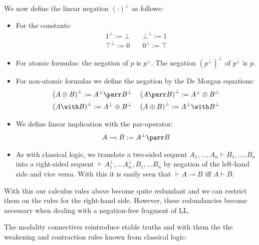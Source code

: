 \documentclass[DIN, pagenumber=false, fontsize=11pt, parskip=half, colorinlistoftodos, svgnames]{scrartcl}
\begin{document}
	
	We now define the linear negation $(\cdot)^\bot$ as follows:
	
	\begin{itemize}
		\item For the constants: 
		\begin{align*}
			1^\bot := \bot \quad 
			& 
			\bot^\bot := 1 
			\\
			\top^\bot := 0 \quad 
			& 
			0^\bot := \top
		\end{align*}
		\item For atomic formulas: the negation of $p$ is $p^\bot$. The negation $\left(p^\bot\right)^\bot$ of $p^\bot $ is $p$.
		\item For non-atomic formulas we define the negation by the De Morgan equations:
		\begin{align*}
			\left(A \otimes B\right)^\bot := A^\bot \parr B^\bot 
			\quad
			&
			\left(A \parr B\right)^\bot := A^\bot \otimes B^\bot 
			\\
			\left(A \with B\right)^\bot := A^\bot \oplus B^\bot 
			\quad
			&
			\left(A \oplus B\right)^\bot := A^\bot \with B^\bot 
		\end{align*}
		\item We define linear implication with the par-operator: 
		\begin{align*}
			A \multimap B := A^\bot \parr B
		\end{align*}
		\item As with classical logic, we translate a two-sided sequent 
		$A_1, ..., A_n \vdash B_1, ..., B_n$ 
		into a right-sided sequent 
		$\vdash A_1^\bot, ... A_n^\bot, B_1, ... B_n$ 
		by negation of the left-hand side and vice versa.
		With this it is easily seen that $\vdash A\multimap B$ iff $A \vdash B$.
		
	\end{itemize}
	
	With this our calculus rules above become quite redundant and we can restrict them on the rules for the right-hand side. However, these redundancies become necessary when dealing with a negation-free fragment of LL.
	
	The modality connectives reintroduce stable truths and with them the the weakening and contraction rules known from classical logic:
	
\end{document}

